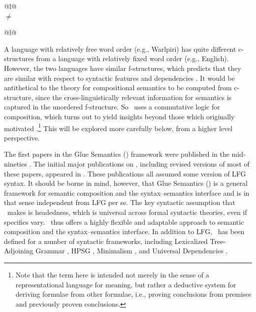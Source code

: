 \documentclass[output=paper,hidelinks]{langscibook}
\begin{document}
  \ea\label{ex:Glue:2}
    \begin{tabular}[t]{@{}l@{}}
    \phantom{$\neq$}
     \\[1ex]
   {$\neq$}
    \end{tabular}\z
\ea\label{ex:Glue:3}
      \begin{tabular}[t]{@{}l@{}}
        \phantom{\raisebox{-1.5ex}{$=$}}
         \\[2.5ex]
        \raisebox{0ex}{$=$}
      \end{tabular}
  \z
% 
A language with relatively free word order (e.g., Warlpiri) 
has quite different c-structures from a language with relatively fixed
word order (e.g., English). However, the two languages have similar
f-structures, which predicts that they are  similar with
respect to syntactic features and dependencies
\citep[ch.\,1]{BresnanEtAl2016}. It would be antithetical to the theory
for compositional semantics to be computed from c-structure, since the
cross-linguistically relevant information for semantics is captured in
the unordered f-structure. So \glues\ uses a commutative logic for
composition, which turns out to yield insights beyond those which
originally motivated \glue.\footnote{Note that the term  here
  is intended not merely in the sense of a representational language
  for meaning, but rather a deductive system for deriving formulae
  from other formulae, i.e., proving conclusions from premises and
  previously proven conclusions.} This will be explored more carefully
below, from a higher level perspective. 

\begin{sloppypar}
  The first papers in the Glue Semantics (\glue) framework were
  published in the mid-nineties
  \citep{dalrympleetal93,dalrymple;ea95b,dalrymple;ea97,dalrymple;ea97b}. The
  initial major publications on \glue, including revised versions of
  most of these papers, appeared in \citet{Dalrymple:Glue}. These
  publications all assumed some version of LFG syntax. It should be
  borne in mind, however, that Glue Semantics (\glue) is a general
  framework for semantic composition and the syntax--semantics
  interface and is in that sense independent from LFG per se. The key
  syntactic assumption that \glue\ makes is headedness, which is
  universal across formal syntactic theories, even if specifics
  vary. \glue\ thus offers a highly flexible and adaptable approach to
  semantic composition and the syntax--semantics interface. In
  addition to LFG, \glues\ has been defined for a number of syntactic
  frameworks, including Lexicalized Tree-Adjoining Grammar
  \citep{frank:gluetag}, HPSG \citep{asudeh:hpsg-glue},
  Minimalism \citep{gotham:minimalist-glue}, and Universal Dependencies
  \citep{gotham-haug:2018}.
\end{sloppypar}
\end{document}
